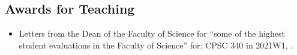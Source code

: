 \documentclass[10pt]{article}
\begin{document}
\nasubsection{
\subsection{Consultant} %
}



\subsection{Awards for Teaching} %

\begin{itemize}[leftmargin=5em]
    \item[] Letters from the Dean of the Faculty of Science for ``some of the highest student evaluations in the Faculty of Science'' for: CPSC 340 in 2021W1, .
\end{itemize}
\end{document}
